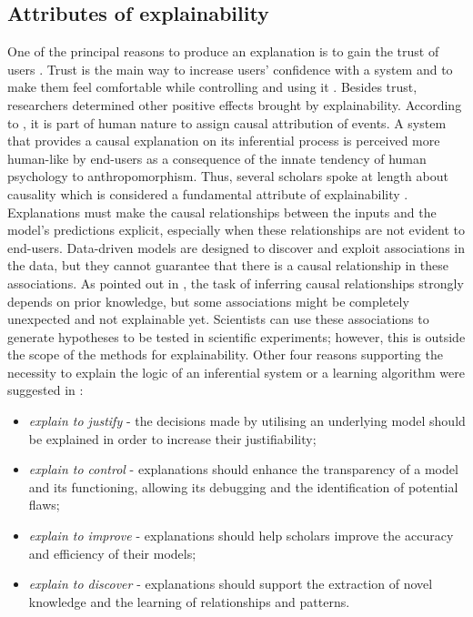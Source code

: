 \documentclass[final,1p,times]{elsarticle}
\begin{document}
\subsection{Attributes of explainability}\label{xaiattributes}
One of the principal reasons to produce an explanation is to gain the trust of users \cite{dzindolet2003role}. Trust is the main way to increase users' confidence with a system \cite{tintarev2007survey} and to make them feel comfortable while controlling and using it \cite{lipton2018mythos}. Besides trust, researchers determined other positive effects brought by explainability. 
According to \cite{ha2018designing}, it is part of human nature to assign causal attribution of events. A system that provides a causal explanation on its inferential process is perceived more human-like by end-users as a consequence of the innate tendency of human psychology to anthropomorphism. Thus, several scholars spoke at length about causality which is considered a fundamental attribute of explainability \cite{fox2017explainable,chajewska1997defining,holzinger2019causability,lipton2018mythos,miller2017explainable}. Explanations must make the causal relationships between the inputs and the model's predictions explicit, especially when these relationships are not evident to end-users. Data-driven models are designed to discover and exploit associations in the data, but they cannot guarantee that there is a causal relationship in these associations. As pointed out in \cite{lipton2018mythos}, the task of inferring causal relationships strongly depends on prior knowledge, but some associations might be completely unexpected and not explainable yet. Scientists can use these associations to generate hypotheses to be tested in scientific experiments; however, this is outside the scope of the methods for explainability. Other four reasons supporting the necessity to explain the logic of an inferential system or a learning algorithm were suggested in \cite{adadi2018peeking}: 
\begin{itemize}
    \item \textit{explain to justify} - the decisions made by utilising an underlying model should be explained in order to increase their justifiability;
    \item \textit{explain to control} - explanations should enhance the transparency of a model and its functioning, allowing its debugging and the identification of potential flaws;
    \item \textit{explain to improve} - explanations should help scholars improve the accuracy and efficiency of their models;
    \item \textit{explain to discover} - explanations should support the extraction of novel knowledge and the learning of relationships and patterns.
\end{itemize}
\end{document}
